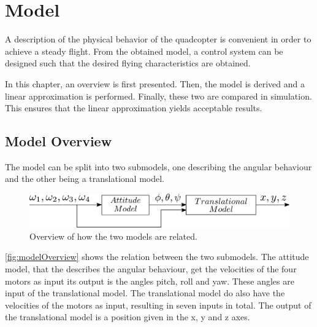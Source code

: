 \chapter{Model}
A description of the physical behavior of the quadcopter is convenient in order to achieve a steady flight. From the obtained model, a control system can be designed such that the desired flying characteristics are obtained.

In this chapter, an overview is first presented. Then, the model is derived and a linear approximation is performed. Finally, these two are compared in simulation. This ensures that the linear approximation yields acceptable results.

\section{Model Overview} \label{sec:ModelOverview}
The model can be split into two submodels, one describing the angular behaviour and the other being a translational model.
\begin{figure}[H]
    \centering
    \includegraphics[scale=0.3]{figures/modelOverview}
    \caption{Overview of how the two models are related.}
    \label{fig:modelOverview}
\end{figure}
%
\autoref{fig:modelOverview} shows the relation between the two submodels. The attitude model, that the describes the angular behaviour, get the velocities of the four motors as input its output is the angles pitch, roll and yaw. These angles are input of the translational model. The translational model do also have the velocities of the motors as input, resulting in seven inputs in total. The output of the translational model is a position given in the x, y and z axes.

